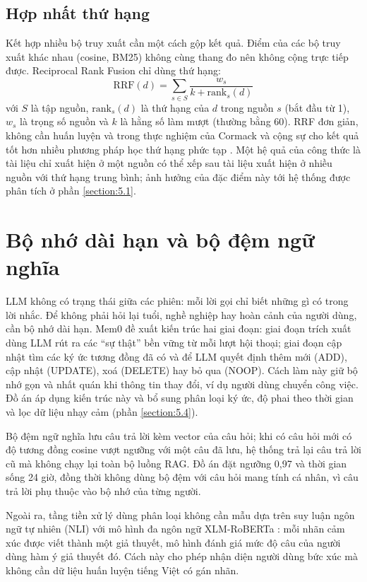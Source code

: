 \documentclass[../DoAn.tex]{subfiles}
\begin{document}
\subsection{Hợp nhất thứ hạng}
Kết hợp nhiều bộ truy xuất cần một cách gộp kết quả. Điểm của các bộ truy xuất khác nhau (cosine, BM25) không cùng thang đo nên không cộng trực tiếp được. Reciprocal Rank Fusion \cite{cormack2009rrf} chỉ dùng thứ hạng:
\begin{equation}\label{eq:rrf}
    \mathrm{RRF}(d) = \sum_{s \in S} \frac{w_s}{k + \mathrm{rank}_s(d)}
\end{equation}
với $S$ là tập nguồn, $\mathrm{rank}_s(d)$ là thứ hạng của $d$ trong nguồn $s$ (bắt đầu từ 1), $w_s$ là trọng số nguồn và $k$ là hằng số làm mượt (thường bằng 60). RRF đơn giản, không cần huấn luyện và trong thực nghiệm của Cormack và cộng sự cho kết quả tốt hơn nhiều phương pháp học thứ hạng phức tạp \cite{cormack2009rrf}. Một hệ quả của công thức là tài liệu chỉ xuất hiện ở một nguồn có thể xếp sau tài liệu xuất hiện ở nhiều nguồn với thứ hạng trung bình; ảnh hưởng của đặc điểm này tới hệ thống được phân tích ở phần \ref{section:5.1}.

\section{Bộ nhớ dài hạn và bộ đệm ngữ nghĩa}
\label{section:3.4}
LLM không có trạng thái giữa các phiên: mỗi lời gọi chỉ biết những gì có trong lời nhắc. Để không phải hỏi lại tuổi, nghề nghiệp hay hoàn cảnh của người dùng, cần bộ nhớ dài hạn. Mem0 \cite{chhikara2025mem0} đề xuất kiến trúc hai giai đoạn: giai đoạn trích xuất dùng LLM rút ra các ``sự thật'' bền vững từ mỗi lượt hội thoại; giai đoạn cập nhật tìm các ký ức tương đồng đã có và để LLM quyết định thêm mới (ADD), cập nhật (UPDATE), xoá (DELETE) hay bỏ qua (NOOP). Cách làm này giữ bộ nhớ gọn và nhất quán khi thông tin thay đổi, ví dụ người dùng chuyển công việc. Đồ án áp dụng kiến trúc này và bổ sung phân loại ký ức, độ phai theo thời gian và lọc dữ liệu nhạy cảm (phần \ref{section:5.4}).

Bộ đệm ngữ nghĩa lưu câu trả lời kèm vector của câu hỏi; khi có câu hỏi mới có độ tương đồng cosine vượt ngưỡng với một câu đã lưu, hệ thống trả lại câu trả lời cũ mà không chạy lại toàn bộ luồng RAG. Đồ án đặt ngưỡng 0,97 và thời gian sống 24 giờ, đồng thời không dùng bộ đệm với câu hỏi mang tính cá nhân, vì câu trả lời phụ thuộc vào bộ nhớ của từng người.

Ngoài ra, tầng tiền xử lý dùng phân loại không cần mẫu dựa trên suy luận ngôn ngữ tự nhiên (NLI) \cite{yin2019zeroshot} với mô hình đa ngôn ngữ XLM-RoBERTa \cite{conneau2020xlmr}: mỗi nhãn cảm xúc được viết thành một giả thuyết, mô hình đánh giá mức độ câu của người dùng hàm ý giả thuyết đó. Cách này cho phép nhận diện người dùng bức xúc mà không cần dữ liệu huấn luyện tiếng Việt có gán nhãn.
\end{document}
